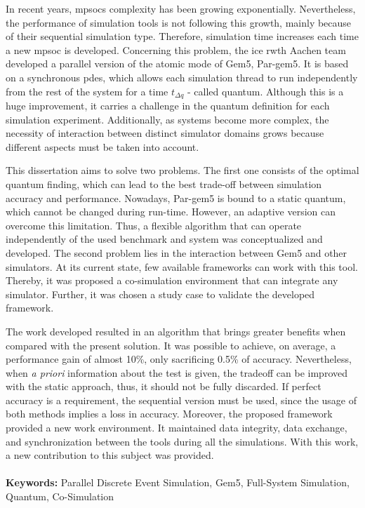 





\vspace*{-0.5cm}

In recent years, \glspl{mpsoc} complexity has been growing exponentially. Nevertheless, the performance of simulation tools is not 
following this growth, mainly because of their sequential simulation type. Therefore, simulation time increases each time a new \gls{mpsoc} 
is developed. Concerning this problem, the \gls{ice} \gls{rwth} Aachen team developed a parallel version of the atomic mode of Gem5, Par-gem5. 
It is based on a synchronous \gls{pdes}, which allows each simulation thread to run independently from the rest of the system for a time 
$t_{\Delta q}$ - called quantum. Although this is a huge improvement, it carries a challenge in the quantum definition for each simulation experiment. 
Additionally, as systems become more complex, the necessity of interaction between distinct simulator domains grows because different aspects 
must be taken into account. 

This dissertation aims to solve two problems. The first one consists of the optimal quantum finding, which can lead to the best trade-off between 
simulation accuracy and performance. Nowadays, Par-gem5 is bound to a static quantum, which cannot be changed during run-time. However, an adaptive 
version can overcome this limitation. Thus, a flexible algorithm that can operate independently of the used benchmark and system was conceptualized and 
developed. The second problem lies in the interaction between Gem5 and other simulators. At its current state, few available 
frameworks can work with this tool. Thereby, it was proposed a co-simulation environment that can integrate any 
simulator. Further, it was chosen a study case to validate the developed framework.

The work developed resulted in an algorithm that brings greater benefits when compared with the present solution. It was possible to achieve, 
on average, a performance gain of almost 10\%, only sacrificing 0.5\% of accuracy. Nevertheless, when \textit{a priori} information about the 
test is given, the tradeoff can be improved with the static approach, thus, it should not be fully discarded. 
If perfect accuracy is a requirement, the sequential version must be used, since the usage of both methods implies a loss in accuracy. 
Moreover, the proposed framework provided a new work environment. It maintained data integrity, data exchange, and synchronization 
between the tools during all the simulations. With this work, a new contribution to this subject was provided.

\paragraph{}\textbf{Keywords:} Parallel Discrete Event Simulation, Gem5, Full-System Simulation, Quantum, Co-Simulation
